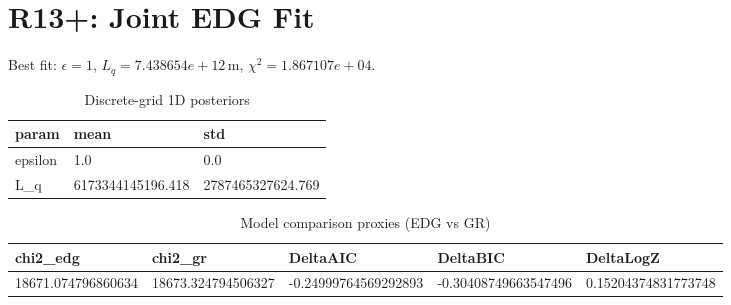 \section{R13+: Joint EDG Fit}
Best fit: $\epsilon = 1$, $L_q = 7.438654e+12\,\mathrm{m}$, $\chi^2 = 1.867107e+04$.
\begin{table}[h!]
\centering
\caption{Discrete-grid 1D posteriors}
\label{tab:r13p_marg}
\begin{tabular}{l | l | l}
\hline
param & mean & std \\
\hline
epsilon & 1.0 & 0.0 \\
L_q & 6173344145196.418 & 2787465327624.769 \\
\hline
\end{tabular}
\end{table}

\begin{table}[h!]
\centering
\caption{Model comparison proxies (EDG vs GR)}
\label{tab:r13p_model}
\begin{tabular}{l | l | l | l | l}
\hline
chi2_edg & chi2_gr & DeltaAIC & DeltaBIC & DeltaLogZ \\
\hline
18671.074796860634 & 18673.324794506327 & -0.24999764569292893 & -0.30408749663547496 & 0.15204374831773748 \\
\hline
\end{tabular}
\end{table}

